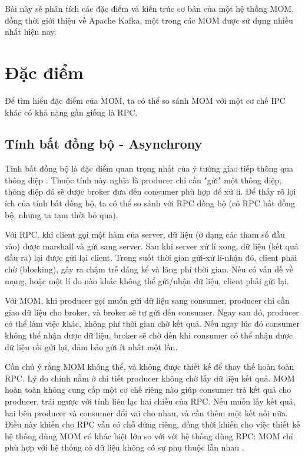 \documentclass{article}
\begin{document}
Bài này sẽ phân tích các đặc điểm và kiến trúc cơ bản của một hệ thống MOM, đồng
thời giới thiệu về Apache Kafka, một trong các MOM được sử dụng nhiều nhất hiện
nay.

\section{Đặc điểm}

Để tìm hiểu đặc điểm của MOM, ta có thể so sánh MOM với một cơ chế IPC khác
có khả năng gần giống là RPC.

\subsection{Tính bất đồng bộ - Asynchrony}

Tính bất đồng bộ là đặc điểm quan trọng nhất của ý tưởng giao tiếp thông qua
thông điệp \cite{inbook}. Thuộc tính này nghĩa là producer chỉ cần "gửi" một
thông điệp, thông điệp đó sẽ được broker đưa đến consumer phù hợp để xử lí. Để
thấy rõ lợi ích của tính bất đồng bộ, ta có thể so sánh với RPC đồng bộ (có RPC
bất đồng bộ, nhưng ta tạm thời bỏ qua).

Với RPC, khi client gọi một hàm của server, dữ liệu (ở dạng các tham số đầu vào)
được marshall và gửi sang server. Sau khi server xử lí xong, dữ liệu (kết quả
đầu ra) lại được gửi lại client. Trong suốt thời gian gửi-xử lí-nhận đó, client
phải chờ (blocking), gây ra chậm trễ đáng kể và lãng phí thời gian. Nếu có vấn
đề về mạng, hoặc một lí do nào khác không thể gửi/nhận dữ liệu, client phải gửi
lại.

Với MOM, khi producer gọi muốn gửi dữ liệu sang consumer, producer chỉ cần giao
dữ liệu cho broker, và broker sẽ tự gửi đến consumer. Ngay sau đó, producer có
thể làm việc khác, không phí thời gian chờ kết quả. Nếu ngay lúc đó consumer
không thể nhận được dữ liệu, broker sẽ chờ đến khi consumer có thể nhận được dữ
liệu rồi gửi lại, đảm bảo gửi ít nhất một lần.

Cần chú ý rằng MOM không thể, và không được thiết kế để thay thế hoàn toàn RPC.
Lý do chính nằm ở chi tiết producer không chờ lấy dữ liệu kết quả. MOM hoàn toàn
không cung cấp một cơ chế riêng nào giúp consumer trả kết quả cho producer, trái
ngược với tính liên lạc hai chiều của RPC. Nếu muốn lấy kết quả, hai bên
producer và consumer đổi vai cho nhau, và cần thêm một kết nối nữa. Điều này
khiến cho RPC vẫn có chỗ đứng riêng, đồng thời khiến cho việc thiết kế hệ thống
dùng MOM có khác biệt lớn so với với hệ thống dùng RPC: MOM chỉ phù hợp với hệ
thống có dữ liệu không có sự phụ thuộc lẫn nhau \cite{ejb3_c4}.
\end{document}
